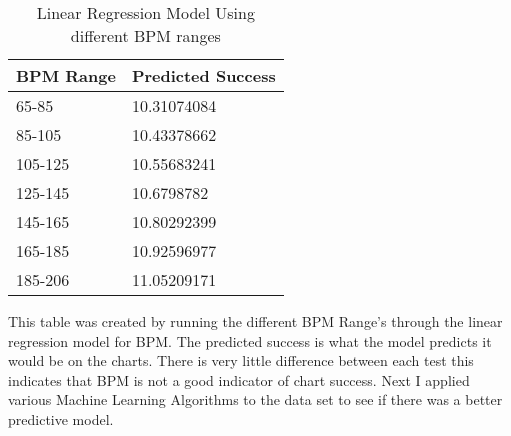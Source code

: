 \documentclass[titlepage]{article}
\begin{document}
\begin{table}[H]
    \centering
    \caption{Linear Regression Model Using different BPM ranges}
    \begin{tabular}{ll}
    \hline
        BPM Range & Predicted Success \\ \hline
        65-85 & 10.31074084 \\ 
        85-105 & 10.43378662 \\ 
        105-125 & 10.55683241 \\ 
        125-145 & 10.6798782 \\ 
        145-165 & 10.80292399 \\ 
        165-185 & 10.92596977 \\ 
        185-206 & 11.05209171 \\ \hline
    \end{tabular}
\end{table}
\noindent This table was created by running the different BPM Range's through the linear regression model for BPM. The predicted success is what the model predicts it would be on the charts. There is very little difference between each test this indicates that BPM is not a good indicator of chart success. 
\newline\newline 
\noindent Next I applied various Machine Learning Algorithms to the data set to see if there was a better predictive model.  

\begin{table}[H]
    \centering
    \caption{Different Machine Learning Models for Key, BPM, and Mode}
\end{table}
\end{document}
